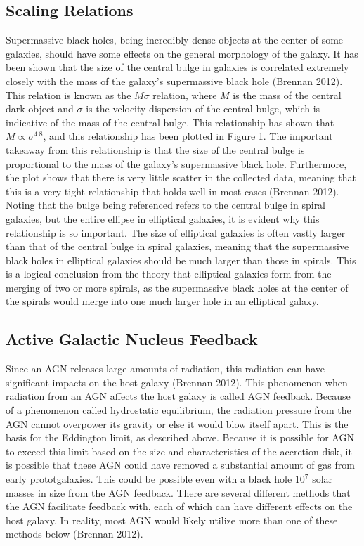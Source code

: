 \documentclass[12pt]{article}
\begin{document}
\subsection{Scaling Relations}
Supermassive black holes, being incredibly dense objects at the center of some
galaxies, should have some effects on the general morphology of the galaxy. It
has been shown that the size of the central bulge in galaxies is correlated
extremely closely with the mass of the galaxy's supermassive black hole (Brennan
2012).  This
relation is known as the $M \sigma$ relation, where $M$ is the mass of the
central dark object and $\sigma$ is the velocity dispersion of the central
bulge, which is indicative of the mass of the central bulge.  This relationship
has shown that $M \propto \sigma^{4.8}$, and this
relationship has been plotted in Figure 1.  The important takeaway from this
relationship is that the size of the central bulge is proportional to the mass
of the galaxy's supermassive black hole.  Furthermore, the plot shows that there
is very little scatter in the collected data, meaning that this is a very tight
relationship that holds well in most cases (Brennan 2012).  Noting that the bulge
being
referenced refers to the central bulge in spiral galaxies, but the entire
ellipse in elliptical galaxies, it is evident why this relationship is so
important.  The size of elliptical galaxies is often vastly larger than that of
the central bulge in spiral galaxies, meaning that the supermassive black holes
in elliptical galaxies should be much larger than those in spirals.  This is a
logical conclusion from the theory that elliptical galaxies form from the
merging of two or more spirals, as the supermassive black holes at the center of
the spirals would merge into one much larger hole in an elliptical galaxy.

\subsection{Active Galactic Nucleus Feedback}
Since an AGN releases large amounts of radiation, this radiation can have
significant impacts on the host galaxy (Brennan 2012).  This phenomenon when
radiation from an
AGN affects the host galaxy is called AGN feedback.  Because of a phenomenon
called
hydrostatic equilibrium, the radiation pressure from the AGN cannot overpower
its gravity or else it would blow itself apart. This is the basis for the
Eddington limit, as described above.  Because it is possible for AGN to exceed
this limit based on the size and characteristics of the
accretion disk, it is possible that these AGN could have removed a substantial
amount of gas from early prototgalaxies.  This could be possible even with a black
hole $10^7$
solar masses in size from the AGN feedback.  There are several different methods
that the AGN facilitate feedback with, each of which can have different effects on
the host galaxy.  In reality, most AGN would likely utilize more than one of
these methods below (Brennan 2012).
\end{document}
